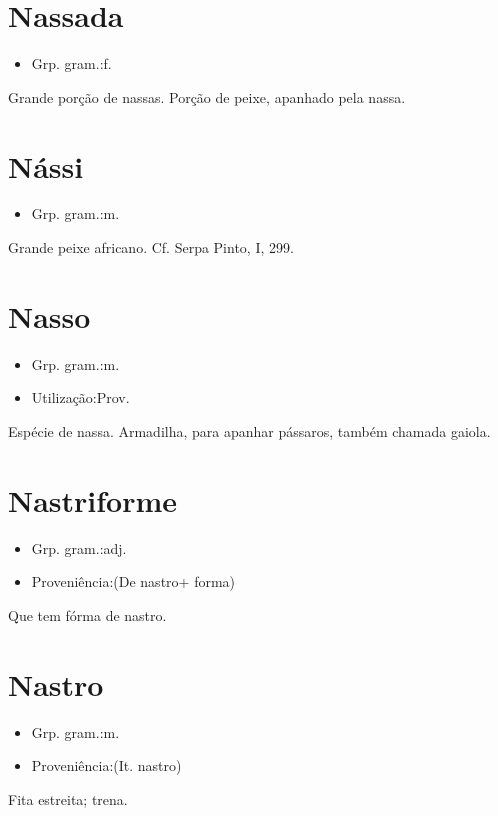 \section{Nassada}
\begin{itemize}
\item {Grp. gram.:f.}
\end{itemize}
Grande porção de nassas.
Porção de peixe, apanhado pela nassa.
\section{Nássi}
\begin{itemize}
\item {Grp. gram.:m.}
\end{itemize}
Grande peixe africano. Cf. Serpa Pinto, I, 299.
\section{Nasso}
\begin{itemize}
\item {Grp. gram.:m.}
\end{itemize}
\begin{itemize}
\item {Utilização:Prov.}
\end{itemize}
Espécie de nassa.
Armadilha, para apanhar pássaros, também chamada gaiola.
\section{Nastriforme}
\begin{itemize}
\item {Grp. gram.:adj.}
\end{itemize}
\begin{itemize}
\item {Proveniência:(De \textunderscore nastro\textunderscore  + \textunderscore forma\textunderscore )}
\end{itemize}
Que tem fórma de nastro.
\section{Nastro}
\begin{itemize}
\item {Grp. gram.:m.}
\end{itemize}
\begin{itemize}
\item {Proveniência:(It. \textunderscore nastro\textunderscore )}
\end{itemize}
Fita estreita; trena.
